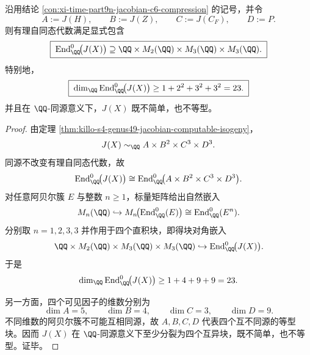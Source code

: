 \begin{theorem}\label{thm:xi-time-part9n-jacobian-endomorphism-lower-bound}
沿用结论 \ref{con:xi-time-part9n-jacobian-c6-compression} 的记号，并令
\[
A:=J(H),\qquad
B:=J(Z),\qquad
C:=J(C_F),\qquad
D:=P.
\]
则有理自同态代数满足显式包含
\[
\boxed{\;
\operatorname{End}^0_{\QQ}\!\bigl(J(X)\bigr)
\supseteq
\QQ\times M_2(\QQ)\times M_3(\QQ)\times M_3(\QQ).\;}
\]
特别地，
\[
\boxed{\;
\dim_{\QQ}\operatorname{End}^0_{\QQ}\!\bigl(J(X)\bigr)\ge 1+2^2+3^2+3^2=23.\;}
\]
并且在 \(\QQ\)-同源意义下，\(J(X)\) 既不简单，也不等型。
\end{theorem}
\begin{proof}
由定理 \ref{thm:killo-s4-genus49-jacobian-computable-isogeny}，
\[
J(X)\sim_{\QQ}A\times B^2\times C^3\times D^3.
\]
同源不改变有理自同态代数，故
\[
\operatorname{End}^0_{\QQ}\!\bigl(J(X)\bigr)
\cong
\operatorname{End}^0_{\QQ}\!\bigl(A\times B^2\times C^3\times D^3\bigr).
\]
对任意阿贝尔簇 \(E\) 与整数 \(n\ge 1\)，标量矩阵给出自然嵌入
\[
M_n(\QQ)\hookrightarrow M_n\!\bigl(\operatorname{End}^0_{\QQ}(E)\bigr)
\cong
\operatorname{End}^0_{\QQ}(E^n).
\]
分别取 \(n=1,2,3,3\) 并作用于四个直积块，即得块对角嵌入
\[
\QQ\times M_2(\QQ)\times M_3(\QQ)\times M_3(\QQ)
\hookrightarrow
\operatorname{End}^0_{\QQ}\!\bigl(J(X)\bigr).
\]
于是
\[
\dim_{\QQ}\operatorname{End}^0_{\QQ}\!\bigl(J(X)\bigr)\ge 1+4+9+9=23.
\]

另一方面，四个可见因子的维数分别为
\[
\dim A=5,\qquad \dim B=4,\qquad \dim C=3,\qquad \dim D=9.
\]
不同维数的阿贝尔簇不可能互相同源，故 \(A,B,C,D\) 代表四个互不同源的等型块。因而 \(J(X)\) 在 \(\QQ\)-同源意义下至少分裂为四个互异块，既不简单，也不等型。证毕。
\end{proof}

